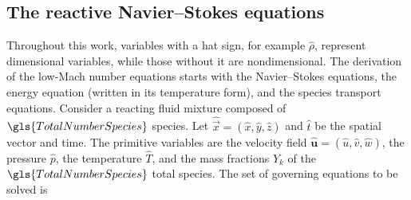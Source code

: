 \subsection{The reactive Navier--Stokes equations}\label{ssect:lowMachModel}
Throughout this work, variables with a hat sign, for example $\hat{\rho}$, represent dimensional variables, while those without it are nondimensional.  The derivation of the low-Mach number equations starts with the Navier--Stokes equations, the energy equation (written in its temperature form), and the species transport equations.
Consider a reacting fluid mixture composed of $\gls{TotalNumberSpecies}$ species. Let $\hat{\vec{x}} =(\hat x, \hat y, \hat z)$ and $\hat t$ be the spatial vector and time. The primitive variables are the velocity field $\hat{\mathbf{u}} =(\hat u, \hat v, \hat w)$, the pressure $\hat p$, the temperature $\hat T$, and the mass fractions $Y_k$ of the $\gls{TotalNumberSpecies}$ total species. The set of governing equations to be solved is
